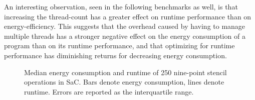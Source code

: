 \documentclass[runningheads]{llncs}
\begin{document}
An interesting observation, seen in the following benchmarks as well, is that increasing the thread-count has a greater effect on runtime performance than on energy-efficiency.
This suggests that the overhead caused by having to manage multiple threads has a stronger negative effect on the energy consumption of a program than on its runtime performance, and that optimizing for runtime performance has diminishing returns for decreasing energy consumption.

\begin{figure}[!t]
  \centering
  \tiny
  \begin{subfigure}{.333\linewidth}
  \end{subfigure}%
  \begin{subfigure}{.333\linewidth}
  \end{subfigure}%
  \begin{subfigure}{.333\linewidth}
  \end{subfigure}%
  \caption{Median energy consumption and runtime of 250 nine-point stencil operations in SaC.
  Bars denote energy consumption, lines denote runtime.
  Errors are reported as the interquartile range.}%
  \label{fig:stencil}
\end{figure}
\end{document}
